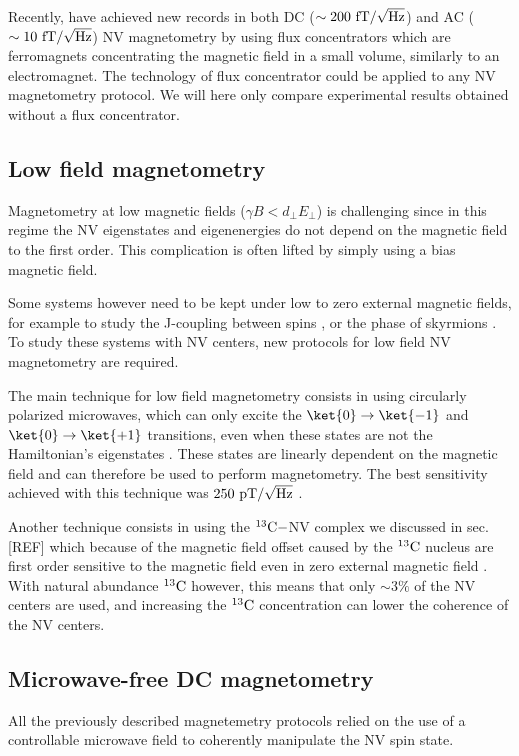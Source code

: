 \documentclass[a4paper, 11pt]{book}
\begin{document}
Recently, \citep{xie2021hybrid} have achieved new records in both DC ($\sim 200\ \rm fT/\sqrt{\rm Hz}$) and AC ($\sim 10\ \rm fT/\sqrt{\rm Hz}$) NV magnetometry by using flux concentrators which are ferromagnets concentrating the magnetic field in a small volume, similarly to an electromagnet. The technology of flux concentrator could be applied to any NV magnetometry protocol. We will here only compare experimental results obtained without a flux concentrator.

\subsection{Low field magnetometry}
Magnetometry at low magnetic fields ($\gamma B < d_\perp E_\perp$) is challenging since in this regime the NV eigenstates and eigenenergies do not depend on the magnetic field to the first order. This complication is often lifted  by simply using a bias magnetic field.

Some systems however need to be kept under low to zero external magnetic fields, for example to study the J-coupling between spins \citep{sutter2012computational}, or the phase of skyrmions \citep{zazvorka2020skyrmion}. To study these systems with NV centers, new protocols for low field NV magnetometry are required.

The main technique for low field magnetometry consists in using circularly polarized microwaves, which can only excite the $\ket{0} \to \ket{-1}$ and $\ket{0} \to \ket{+1}$ transitions, even when these states are not the Hamiltonian's eigenstates \citep{mrozek2015circularly, zheng2019zero, lenz2021magnetic, vetter2022zero}. These states are linearly dependent on the magnetic field and can therefore be used to perform magnetometry. The best sensitivity achieved with this technique was $250\ \rm pT/\sqrt{\rm Hz}$ \citep{zheng2019zero}.

Another technique consists in using the $^{13}\rm{C}-$NV complex we discussed in sec. [REF] which because of the magnetic field offset caused by the $^{13}\rm{C}$ nucleus are first order sensitive to the magnetic field even in zero external magnetic field \citep{wang2022zero}. With natural abundance $^{13}\rm{C}$ however, this means that only $\sim 3\%$ of the NV centers are used, and increasing the $^{13}\rm{C}$ concentration can lower the coherence of the NV centers. 

\subsection{Microwave-free DC magnetometry}
All the previously described magnetemetry protocols relied on the use of a controllable microwave field to coherently manipulate the NV spin state.
\end{document}
